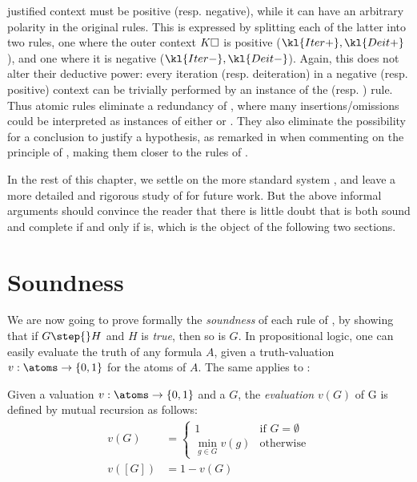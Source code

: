 \begin{scope}
\begin{description}
  justified context must be positive (resp. negative), while it can have an
  arbitrary polarity in the original rules. This is expressed by splitting each
  of the latter into two rules, one where the outer context $K\square$ is positive
  ($\kl{Iter{+}},\kl{Deit{+}}$), and one where it is negative
  ($\kl{Iter{-}},\kl{Deit{-}}$). Again, this does not alter their deductive
  power: every iteration (resp. deiteration) in a negative (resp. positive)
  context can be trivially performed by an instance of the  (resp.
  ) rule. Thus atomic rules eliminate a redundancy of ,
  where many insertions/omissions could be interpreted as instances of either
   or . They also eliminate the possibility for a
  conclusion to justify a hypothesis, as remarked in  when
  commenting on the principle of , making them closer to the
  rules of .
\end{description}

In the rest of this chapter, we settle on the more standard system ,
and leave a more detailed and rigorous study of  for future work.
But the above informal arguments should convince the reader that there is little
doubt that  is both sound and complete if and only if 
is, which is the object of the following two sections.

\section{Soundness}

We are now going to prove formally the \emph{soundness} of each rule of
, by showing that if $G \step{} H$ and $H$ is \emph{true}, then so is
$G$. In  propositional logic, one can easily evaluate the truth of any
formula $A$, given a truth-valuation $v : \atoms \to \{0,1\}$ for the atoms of
$A$. The same applies to :

\begin{definition}[Evaluation]

  Given a valuation $v : \atoms \to \{0,1\}$ and a  $G$, the
  \emph{evaluation} $v(G)$ of G is defined by mutual recursion as follows:
  \begin{align*}
    v(G) &= \begin{cases}
      1 &\text{if $G = \emptyset$} \\
      \min_{g \in G}{v(g)} &\text{otherwise}
    \end{cases} \\
    v([G]) &= 1 - v(G)
  \end{align*}
\end{definition}


\end{scope}
